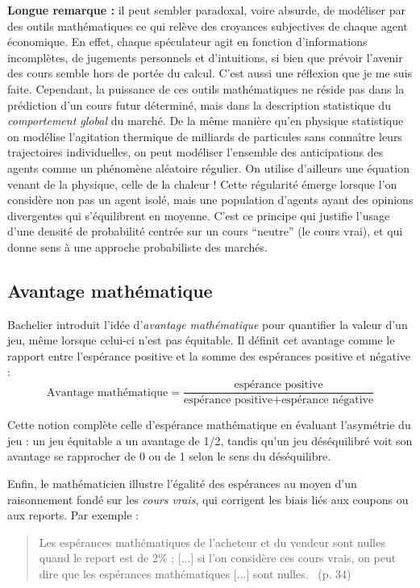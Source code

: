 \documentclass[12pt,a4paper]{article}
\begin{document}
\noindent
\textbf{Longue remarque : } il peut sembler paradoxal, voire absurde, de modéliser par des outils mathématiques ce qui relève des croyances subjectives de chaque agent économique. En effet, chaque spéculateur agit en fonction d'informations incomplètes, de jugements personnels et d’intuitions, si bien que prévoir l’avenir des cours semble hors de portée du calcul. C'est aussi une réflexion que je me suis faite. Cependant, la puissance de ces outils mathématiques ne réside pas dans la prédiction d’un cours futur déterminé, mais dans la description statistique du \textit{comportement global} du marché. De la même manière qu'en physique statistique on modélise l’agitation thermique de milliards de particules sans connaître leurs trajectoires individuelles, on peut modéliser l'ensemble des anticipations des agents comme un phénomène aléatoire régulier. On utilise d'ailleurs une équation venant de la physique, celle de la chaleur ! Cette régularité émerge lorsque l’on considère non pas un agent isolé, mais une population d’agents ayant des opinions divergentes qui s’équilibrent en moyenne. C’est ce principe qui justifie l’usage d’une densité de probabilité centrée sur un cours ``neutre'' (le cours vrai), et qui donne sens à une approche probabiliste des marchés.

\subsection{Avantage mathématique}

Bachelier introduit l’idée d’\textit{avantage mathématique} pour quantifier la valeur d’un jeu, même lorsque celui-ci n’est pas équitable. Il définit cet avantage comme le rapport entre l’espérance positive et la somme des espérances positive et négative :
\[
\text{Avantage mathématique} = \frac{\text{espérance positive}}{\text{espérance positive} + \text{espérance négative}}
\]

Cette notion complète celle d’espérance mathématique en évaluant l’asymétrie du jeu : un jeu équitable a un avantage de 1/2, tandis qu’un jeu déséquilibré voit son avantage se rapprocher de 0 ou de 1 selon le sens du déséquilibre.

Enfin, le mathématicien illustre l’égalité des espérances au moyen d’un raisonnement fondé sur les \textit{cours vrais}, qui corrigent les biais liés aux coupons ou aux reports. Par exemple :
\begin{quote}
    \og Les espérances mathématiques de l’acheteur et du vendeur sont nulles quand le report est de 2\% ; [...] si l’on considère ces cours vrais, on peut dire que les espérances mathématiques [...] sont nulles. \fg\ (p. 34)
\end{quote}
\end{document}
